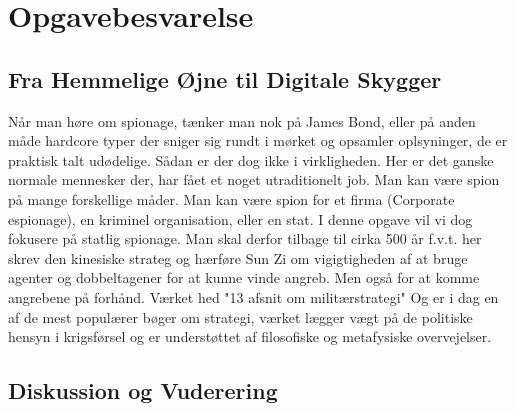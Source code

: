 \newpage
\section{Opgavebesvarelse}\label{sec:OpgaveBesvarelse}

\subsection{Fra Hemmelige Øjne til Digitale Skygger}\label{sec:Redegorsel}
Når man høre om spionage, tænker man nok på James Bond, eller på anden måde hardcore typer der sniger sig rundt i mørket og opsamler oplsyninger, de er praktisk talt udødelige. Sådan er der dog ikke i virkligheden. Her er det ganske normale mennesker der, har fået et noget utraditionelt job. Man kan være spion på mange forskellige måder. Man kan være spion for et firma (Corporate espionage), en kriminel organisation, eller en stat. I denne opgave vil vi dog fokusere på statlig spionage. Man skal derfor tilbage til cirka 500 år f.v.t. her skrev den kinesiske strateg og hærføre Sun Zi om vigigtigheden af at bruge agenter og dobbeltagener for at kunne vinde angreb. Men også for at komme angrebene på forhånd. Værket hed "13 afsnit om militærstrategi" Og er i dag en af de mest populærer bøger om strategi, værket lægger vægt på de politiske hensyn i krigsførsel og er understøttet af filosofiske og metafysiske overvejelser. 


\newpage
\subsection{Diskussion og Vuderering}



\newpage